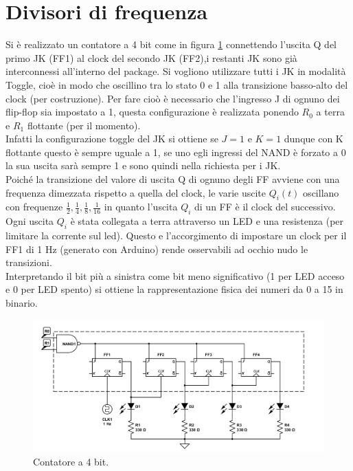\documentclass[10pt,a4paper]{article}
\begin{document}

\section{Divisori di frequenza}
Si è realizzato un contatore a 4 bit come in figura \ref{contatore} connettendo l'uscita Q del primo JK (FF1) al clock del secondo JK (FF2),i restanti JK sono già interconnessi all'interno del package. Si vogliono utilizzare tutti i JK in modalità Toggle, cioè in modo che oscillino tra lo stato 0 e 1 alla transizione basso-alto del clock (per costruzione). Per fare cioò è necessario che l'ingresso J di ognuno dei flip-flop sia impostato a 1, questa configurazione è realizzata ponendo $R_0$ a terra e $R_1$ flottante (per il momento).\\
Infatti la configurazione toggle del JK si ottiene se $J = 1$ e $K = 1$ dunque con K flottante questo è sempre uguale a 1, se uno egli ingressi del NAND è forzato a 0 la sua uscita sarà sempre 1 e sono quindi nella richiesta per i JK.\\  
Poiché la transizione del valore di uscita Q di ognuno degli FF avviene con una frequenza dimezzata rispetto a quella del clock, le varie uscite $Q_i(t)$ oscillano con frequenze $\frac{1}{2}, \frac{1}{4}, \frac{1}{8}, \frac{1}{16}$ in quanto l'uscita $Q_i$ di un FF è il clock del successivo.\\
Ogni uscita $Q_i$ è stata collegata a terra attraverso un LED e una resistenza (per limitare la corrente sul led). Questo e l'accorgimento di impostare un clock per il FF1 di 1 Hz (generato con Arduino) rende osservabili ad occhio nudo le transizioni.\\
Interpretando il bit più a sinistra come bit meno significativo (1 per LED acceso e 0 per LED spento) si ottiene la rappresentazione fisica dei numeri da 0 a 15 in binario.\\

\begin{figure}
\centering
\includegraphics[scale=0.5]{divisore.png}
\caption{Contatore a 4 bit.\label{contatore}}
\end{figure}
\end{document}
